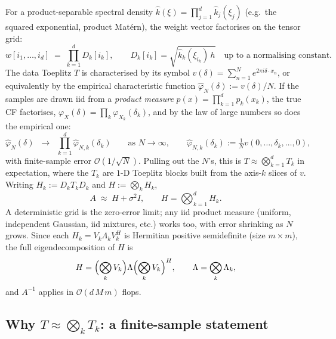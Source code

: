\documentclass[11pt]{article}
\newcommand{\bigo}{\mathcal{O}}
\begin{document}
For a product-separable spectral density $\hat k(\xi) = \prod_{j=1}^d
\hat k_j(\xi_j)$ (e.g.\ the squared exponential, product Mat\'{e}rn), the
weight vector factorises on the tensor grid:
\begin{equation}
  w[i_1,\ldots,i_d] \;=\; \prod_{k=1}^d D_k[i_k],
  \qquad
  D_k[i_k] = \sqrt{\hat k_k(\xi_{i_k})\, h}
  \quad \text{up to a normalising constant.}
  \label{eq:w-factor}
\end{equation}
The data Toeplitz $T$ is characterised by its symbol
$v(\delta) = \sum_{n=1}^N e^{2\pi i \delta \cdot x_n}$, or equivalently by
the empirical characteristic function
$\hat\varphi_N(\delta) := v(\delta)/N$.
If the samples are drawn iid from a \emph{product measure}
$p(x) = \prod_{k=1}^d p_k(x_k)$, the true CF factorises,
$\varphi_X(\delta) = \prod_k \varphi_{X_k}(\delta_k)$, and by the
law of large numbers so does the empirical one:
\begin{equation}
  \hat\varphi_N(\delta) \;\;\longrightarrow\;\;
  \prod_{k=1}^d \hat\varphi_{N,k}(\delta_k)
  \qquad \text{as } N\to\infty,
  \qquad
  \hat\varphi_{N,k}(\delta_k) := \tfrac{1}{N}v(0,\ldots,\delta_k,\ldots,0),
  \label{eq:v-factor}
\end{equation}
with finite-sample error $\mathcal{O}(1/\sqrt N)$. Pulling out the $N$'s,
this is $T \approx \bigotimes_{k=1}^d T_k$ in expectation, where the $T_k$
are $1$-D Toeplitz blocks built from the axis-$k$ slices of $v$. Writing
$H_k := D_k T_k D_k$ and $H := \bigotimes_k H_k$,
\begin{equation}
  A \;\approx\; H + \sigma^2 I,\qquad
  H = \bigotimes_{k=1}^d H_k.
  \label{eq:kron-ideal}
\end{equation}
A deterministic grid is the zero-error limit; any iid product measure
(uniform, independent Gaussian, iid mixtures, etc.) works too, with
error shrinking as $N$ grows.
Since each $H_k = V_k \Lambda_k V_k^H$ is Hermitian positive
semidefinite (size $m\times m$), the full eigendecomposition of $H$ is
\begin{equation}
  H = \Bigl(\bigotimes_k V_k\Bigr) \Lambda \Bigl(\bigotimes_k V_k\Bigr)^H,
  \qquad
  \Lambda = \bigotimes_k \Lambda_k,
  \label{eq:kron-eig}
\end{equation}
and $A^{-1}$ applies in $\bigo(d\, M\,m)$ flops.
\subsection{Why $T \approx \bigotimes_k T_k$: a finite-sample statement}
\end{document}
